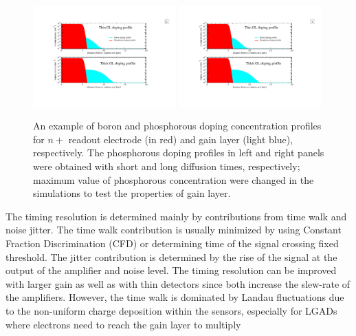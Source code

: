 \documentclass[aps,pt14,superscriptaddress,showpacs,floatfix,nofootinbib]{revtex4}
\begin{document}
\begin{figure}[hbtp]
\begin{center}
\includegraphics[width=0.49\textwidth,keepaspectratio]{figures1/ThinDopingProfile.pdf}
\includegraphics[width=0.49\textwidth,keepaspectratio]{figures1/ThickDopingProfile.pdf}
\caption{An example of boron and phosphorous doping concentration profiles for $n+$ readout electrode (in red) and gain layer (light blue), respectively. The phosphorous doping profiles in left and right panels were obtained with short and long diffusion times, respectively; maximum value of phosphorous concentration were changed in the simulations to test the properties of gain layer.\label{fig:DopingProfiles}} 
\end{center}
\end{figure}

The timing resolution is determined mainly by contributions from time walk and noise
jitter. The time walk contribution is usually minimized by using Constant Fraction
Discrimination (CFD) or determining time of the signal crossing fixed threshold.
The jitter contribution is determined by the rise of the signal at the output of
the amplifier and noise level. The timing resolution can be improved with larger
gain as well as with thin detectors since both increase the slew-rate of the amplifiers.
However, the time walk is dominated by Landau fluctuations due to
the non-uniform charge deposition within the sensors, especially for LGADs where
electrons need to reach the gain layer to multiply
\end{document}
